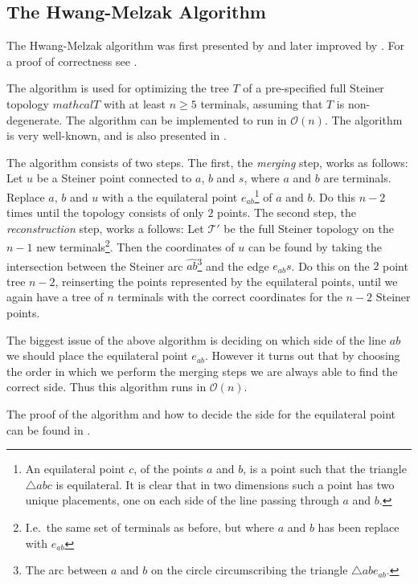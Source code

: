\subsection{The Hwang-Melzak Algorithm}
\label{sec:hwang-melz-algor}

The Hwang-Melzak algorithm was first presented by \textcite{melzak1961} and
later improved by \textcite{hwang1986hexagonal}. For a proof of correctness see
\textcite{hwang1986linear, melzak1961}.

The algorithm is used for optimizing the tree $T$ of a pre-specified full
Steiner topology $mathcal{T}$ with at least $n \ge 5$ terminals, assuming that
$T$ is non-degenerate. The algorithm can be implemented to run in
$\mathcal{O}(n)$. The algorithm is very well-known, and is also presented in
\textcite{brazil2015,smith1992}.

The algorithm consists of two steps. The first, the \textit{merging} step, works
as follows: Let $u$ be a Steiner point connected to $a$, $b$ and $s$, where $a$
and $b$ are terminals. Replace $a$, $b$ and $u$ with a the equilateral point
$e_{ab}$\footnote{An equilateral point $c$, of the points $a$ and $b$, is a
  point such that the triangle $\triangle a b c$ is equilateral. It is clear
  that in two dimensions such a point has two unique placements, one on each
  side of the line passing through $a$ and $b$.} of $a$ and $b$. Do this $n-2$
times until the topology consists of only $2$ points. The second step, the
\textit{reconstruction} step, works a follows: Let $\mathcal{T}'$ be the
full Steiner topology on the $n-1$ new terminals\footnote{I.e.\ the same set of terminals as
  before, but where $a$ and $b$ has been replace with $e_{ab}$}. Then the
coordinates of $u$ can be found by taking the intersection between the Steiner
arc $\hat{ab}$\footnote{The arc between $a$ and $b$ on the circle circumscribing
  the triangle $\triangle a b e_{ab}$.} and the edge $e_{ab}s$. Do this on the
$2$ point tree $n-2$, reinserting the points represented by the equilateral
points, until we again have a tree of $n$ terminals with the correct coordinates
for the $n-2$ Steiner points.

The biggest issue of the above algorithm is deciding on which side of the line
$ab$ we should place the equilateral point $e_{ab}$. However it turns out that
by choosing the order in which we perform the merging steps we are always able
to find the correct side. Thus this algorithm runs in $\mathcal{O}(n)$.

The proof of the algorithm and how to decide the side for the equilateral point
can be found in \textcite[ch.~1]{brazil2015}.


